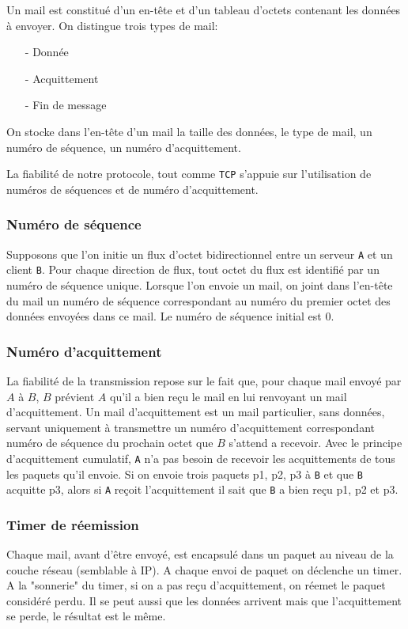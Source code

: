 \documentclass[11pt]{article}
\theoremstyle{definition}
\theoremstyle{definition}
\begin{document}
Un mail est constitué d'un en-tête et d'un tableau d'octets contenant les données à envoyer.
On distingue trois types de mail:
\begin{itemize}
\item[-]Donnée
\item[-]Acquittement
\item[-]Fin de message
\end{itemize}

On stocke dans l'en-tête d'un mail la taille des données, le type de mail, un numéro de séquence, un
numéro d'acquittement.

La fiabilité de notre protocole, tout comme \texttt{TCP} s'appuie sur l'utilisation de numéros de séquences
et de numéro d'acquittement.

\subsubsection{Numéro de séquence}
Supposons que l'on initie un flux d'octet bidirectionnel entre un serveur \texttt{A} et un client \texttt{B}.
Pour chaque direction de flux, tout octet du flux est identifié par un numéro de séquence unique. 
Lorsque l'on envoie un mail, on joint dans l'en-tête du mail un numéro de séquence correspondant
au numéro du premier octet des données envoyées dans ce mail. Le numéro de séquence initial est $0$.

\subsubsection{Numéro d'acquittement}
La fiabilité de la transmission repose sur le fait que, pour chaque mail envoyé par $A$ à $B$, $B$ prévient $A$ qu'il a bien reçu le mail en lui renvoyant un mail d'acquittement.
Un mail d'acquittement est un mail particulier, sans données, servant uniquement à transmettre un numéro d'acquittement correspondant numéro de séquence du prochain octet que $B$ s'attend a recevoir.
Avec le principe d'acquittement cumulatif, \texttt{A} n'a pas besoin de recevoir les acquittements de tous les paquets qu'il envoie. Si on envoie trois paquets p1, p2, p3 à \texttt{B} et que \texttt{B}
acquitte p3, alors si \texttt{A} reçoit l'acquittement il sait que \texttt{B} a bien reçu p1, p2 et p3.

\subsubsection{Timer de réemission}
Chaque mail, avant d'être envoyé, est encapsulé dans un paquet au niveau de la couche réseau (semblable à IP). A chaque envoi de paquet on déclenche un timer. A la "sonnerie" du timer, si on a pas reçu d'acquittement, on réemet le paquet considéré perdu. Il se peut aussi que les données arrivent mais que l'acquittement se perde, le résultat est le même. 
\end{document}
